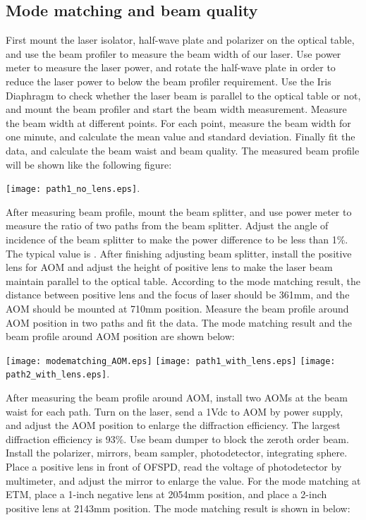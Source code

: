 \subsection{Mode matching and beam quality}
First mount the laser isolator, half-wave plate and polarizer on the optical table, and use the \underline{\qquad\qquad} beam profiler to measure the beam width of our laser. Use power meter to measure the laser power, and rotate the half-wave plate in order to reduce the laser power to below the beam profiler requirement. Use the Iris Diaphragm to check whether the laser beam is parallel to the optical table or not, and mount the beam profiler and start the beam width measurement. Measure the beam width at different points. For each point, measure the beam width for one minute, and calculate the mean value and standard deviation. Finally fit the data, and calculate the beam waist and beam quality. The measured beam profile will be shown like the following figure:

\texttt{[image: path1\_no\_lens.eps]}.

After measuring beam profile, mount the beam splitter, and use power meter to measure the ratio of two paths from the beam splitter. Adjust the angle of incidence of the beam splitter to make the power difference to be less than 1$\%$. The typical value is \underline{\qquad\qquad}. After finishing adjusting beam splitter, install the positive lens for AOM and adjust the height of positive lens to make the laser beam maintain parallel to the optical table. According to the mode matching result, the distance between positive lens and the focus of laser should be 361mm, and the AOM should be mounted at 710mm position. Measure the beam profile around AOM position in two paths and fit the data. The mode matching result and the beam profile around AOM position are shown below:

\begin{center}
	\texttt{[image: modematching\_AOM.eps]}
	\texttt{[image: path1\_with\_lens.eps]}
	\texttt{[image: path2\_with\_lens.eps]}.
\end{center}



After measuring the beam profile around AOM, install two AOMs at the beam waist for each path. Turn on the laser, send a 1Vdc to AOM by power supply, and adjust the AOM position to enlarge the diffraction efficiency. The largest diffraction efficiency is 93$\%$. Use beam dumper to block the zeroth order beam. Install the polarizer, mirrors, beam sampler, photodetector, integrating sphere. Place a positive lens in front of OFSPD, read the voltage of photodetector by multimeter, and adjust the mirror to enlarge the value. For the mode matching at ETM, place a 1-inch negative lens at 2054mm position, and place a 2-inch positive lens at 2143mm position. The mode matching result is shown in below:


